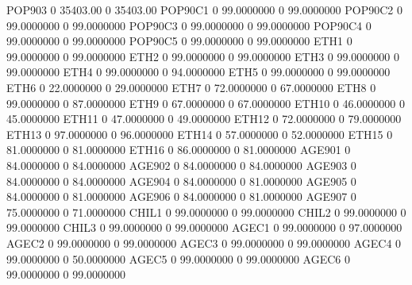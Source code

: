 \documentclass[
  11pt,
  a4paper,
  DIV=12,captions=tableheading,oneside,titlepage]{scrbook}
\let\oldverbatim\verbatim
\let\endoldverbatim\endverbatim
\renewenvironment{verbatim}{\footnotesize\oldverbatim}{\endoldverbatim}
\begin{document}
\begin{verbatim}
  POP903                 0      35403.00             0      35403.00 
  POP90C1                0    99.0000000             0    99.0000000 
  POP90C2                0    99.0000000             0    99.0000000 
  POP90C3                0    99.0000000             0    99.0000000 
  POP90C4                0    99.0000000             0    99.0000000 
  POP90C5                0    99.0000000             0    99.0000000 
  ETH1                   0    99.0000000             0    99.0000000 
  ETH2                   0    99.0000000             0    99.0000000 
  ETH3                   0    99.0000000             0    99.0000000 
  ETH4                   0    99.0000000             0    94.0000000 
  ETH5                   0    99.0000000             0    99.0000000 
  ETH6                   0    22.0000000             0    29.0000000 
  ETH7                   0    72.0000000             0    67.0000000 
  ETH8                   0    99.0000000             0    87.0000000 
  ETH9                   0    67.0000000             0    67.0000000 
  ETH10                  0    46.0000000             0    45.0000000 
  ETH11                  0    47.0000000             0    49.0000000 
  ETH12                  0    72.0000000             0    79.0000000 
  ETH13                  0    97.0000000             0    96.0000000 
  ETH14                  0    57.0000000             0    52.0000000 
  ETH15                  0    81.0000000             0    81.0000000 
  ETH16                  0    86.0000000             0    81.0000000 
  AGE901                 0    84.0000000             0    84.0000000 
  AGE902                 0    84.0000000             0    84.0000000 
  AGE903                 0    84.0000000             0    84.0000000 
  AGE904                 0    84.0000000             0    81.0000000 
  AGE905                 0    84.0000000             0    81.0000000 
  AGE906                 0    84.0000000             0    81.0000000 
  AGE907                 0    75.0000000             0    71.0000000 
  CHIL1                  0    99.0000000             0    99.0000000 
  CHIL2                  0    99.0000000             0    99.0000000 
  CHIL3                  0    99.0000000             0    99.0000000 
  AGEC1                  0    99.0000000             0    97.0000000 
  AGEC2                  0    99.0000000             0    99.0000000 
  AGEC3                  0    99.0000000             0    99.0000000 
  AGEC4                  0    99.0000000             0    50.0000000 
  AGEC5                  0    99.0000000             0    99.0000000 
  AGEC6                  0    99.0000000             0    99.0000000 

\end{verbatim}
\end{document}
